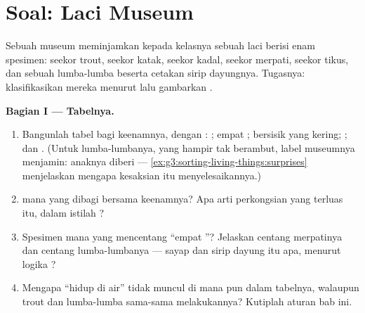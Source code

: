 \section{Soal: Laci Museum}

\begin{problem}\label{pb:g6:classification-kinship:1}
Sebuah museum meminjamkan kepada kelasnya sebuah laci berisi enam
spesimen: seekor  trout, seekor katak, seekor kadal, seekor
merpati, seekor tikus, dan sebuah  lumba-lumba beserta cetakan
sirip dayungnya. Tugasnya: klasifikasikan mereka menurut  lalu
gambarkan .

\medskip\noindent\textbf{Bagian I --- Tabelnya.}
\begin{enumerate}
  \item Bangunlah tabel bagi keenamnya, dengan : ; empat ;  bersisik yang kering;
        ;  dan . (Untuk lumba-lumbanya, yang hampir
        tak berambut, label museumnya menjamin: anaknya diberi 
        --- \cref{ex:g3:sorting-living-things:surprises} menjelaskan
        mengapa kesaksian itu menyelesaikannya.)
  \item {} mana yang dibagi bersama keenamnya? Apa arti perkongsian
        yang terluas itu, dalam istilah ?
  \item Spesimen mana yang mencentang ``empat ''?
        Jelaskan centang merpatinya dan centang lumba-lumbanya ---
        sayap dan sirip dayung itu apa, menurut logika ?
  \item Mengapa ``hidup di air'' tidak muncul di mana pun dalam
        tabelnya, walaupun  trout dan lumba-lumba sama-sama
        melakukannya? Kutiplah aturan bab ini.
\end{enumerate}


\end{problem}
